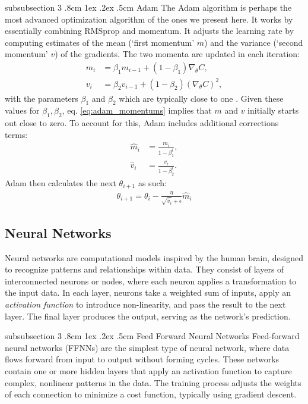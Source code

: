 \documentclass[%
reprint,s
amsmath,amssymb,
aps,
]{revtex4-2}
\makeatletter
\renewcommand{\subsubsection}{%
	\@startsection
	{subsubsection}%
	{3}%
	{\z@}%
	{.8cm \@plus1ex \@minus .2ex}%
	{.5cm}%
	{\normalfont\small\centering}%
}
\makeatother
\begin{document}
\subsubsection{Adam}
The Adam algorithm is perhaps the most advanced optimization algorithm of the ones we present here. It works by essentially combining RMSprop and momentum. It adjusts the learning rate by computing estimates of the mean (`first momentum' \(m\)) and the variance (`second momentum' \(v\)) of the gradients. The two momenta are updated in each iteration:
\begin{align}	\label{eq:adam_momentums}
	m_i&=\beta_1m_{i-1}+(1-\beta_1) \nabla_\theta C,\\
    v_i&=\beta_2v_{i-1}+(1-\beta_2) (\nabla_\theta C)^2,
\end{align}
with the parameters \(\beta_1\) and \(\beta_2\) which are typically close to one \cite{fys-stk}. Given these values for \(\beta_1, \beta_2\), eq. \eqref{eq:adam_momentums} implies that \(m\) and \(v\) initially starts out close to zero. To account for this, Adam includes additional corrections terms:
\begin{align}
	\hat{m}_i &=\frac{m_i}{1-\beta_1^i},\\
    \hat{v}_i &=\frac{v_i}{1-\beta_2^i}.
\end{align}
Adam then calculates the next \(\theta_{i+1}\) as such:
\begin{align}
	\theta_{i+1}=\theta_{i}-\frac{\eta}{\sqrt{\hat{v}_i}+\epsilon}\hat{m}_i
\end{align}

\subsection{Neural Networks}	\label{sec:neutral_networks}
Neural networks are computational models inspired by the human brain, designed to recognize patterns and relationships within data. They consist of layers of interconnected neurons or nodes, where each neuron applies a transformation to the input data. In each layer, neurons take a weighted sum of inputs, apply an \textit{activation function} to introduce non-linearity, and pass the result to the next layer. The final layer produces the output, serving as the network’s prediction.

\subsubsection{Feed Forward Neural Networks}
Feed-forward neural networks (FFNNs) are the simplest type of neural network, where data flows forward from input to output without forming cycles. These networks contain one or more hidden layers that apply an activation function to capture complex, nonlinear patterns in the data. The training process adjusts the weights of each connection to minimize a cost function, typically using gradient descent.
\end{document}
